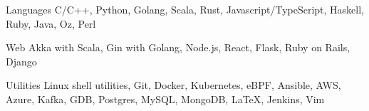 

\begin{cvskills}


  \cvskill
  {Languages}
  {C/C++, Python, Golang, Scala, Rust, Javascript/TypeScript, Haskell, Ruby, Java, Oz, Perl}


  \cvskill
  {Web}
  {Akka with Scala, Gin with Golang, Node.js, React, Flask, Ruby on Rails, Django}


  \cvskill
  {Utilities}
  {Linux shell utilities, Git, Docker, Kubernetes, eBPF, Ansible, AWS, Azure, Kafka, GDB, Postgres, MySQL, MongoDB, \LaTeX, Jenkins, Vim}




\end{cvskills}
